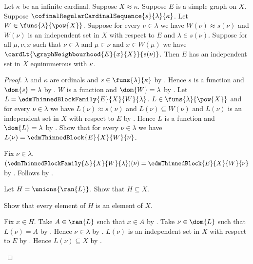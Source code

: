 \begin{theorem}\label{singular_selected_blocks_assemble}
    Let $\kappa$ be an infinite cardinal.
    Suppose $X\approx\kappa$.
    Suppose $E$ is a simple graph on $X$.
    Suppose $\cofinalRegularCardinalSequence{s}{\lambda}{\kappa}$.
    Let $W\in\funs{\lambda}{\pow{X}}$.
    Suppose for every $\nu\in\lambda$ we have
        $W(\nu)\approx s(\nu)$ and
        $W(\nu)$ is an independent set in $X$ with respect to $E$ and
        $\lambda\in s(\nu)$.
    Suppose for all $\mu,\nu,x$ such that $\nu\in\lambda$ and
        $\mu\in\nu$ and $x\in W(\mu)$ we have
        $\cardLt{\graphNeighbourhood{E}{x}{X}}{s(\nu)}$.
    Then $E$ has an independent set in $X$ equinumerous with $\kappa$.
\end{theorem}
\begin{proof}
    $\lambda$ and $\kappa$ are ordinals and
        $s\in\funs{\lambda}{\kappa}$ by
        .
    Hence $s$ is a function and $\dom{s}=\lambda$ by
        .
    $W$ is a function and $\dom{W}=\lambda$ by
        .
    Let $L=\edmThinnedBlockFamily{E}{X}{W}{\lambda}$.
    $L\in\funs{\lambda}{\pow{X}}$ and
        for every $\nu\in\lambda$ we have
            $L(\nu)\approx s(\nu)$ and $L(\nu)\subseteq W(\nu)$ and
            $L(\nu)$ is an independent set in $X$ with respect to $E$ by
        .
    Hence $L$ is a function and $\dom{L}=\lambda$ by
        .
    Show that for every $\nu\in\lambda$ we have
        $L(\nu)=\edmThinnedBlock{E}{X}{W}{\nu}$.
    \begin{subproof}
        Fix $\nu\in\lambda$.
        $(\edmThinnedBlockFamily{E}{X}{W}{\lambda})(\nu)
            =\edmThinnedBlock{E}{X}{W}{\nu}$ by
            .
        Follows by \auto.
    \end{subproof}
    Let $H=\unions{\ran{L}}$.
    Show that $H\subseteq X$.
    \begin{subproof}
        Show that every element of $H$ is an element of $X$.
        \begin{subproof}
            Fix $x\in H$.
            Take $A\in\ran{L}$ such that $x\in A$ by
                .
            Take $\nu\in\dom{L}$ such that $L(\nu)=A$ by
                .
            Hence $\nu\in\lambda$ by \auto.
            $L(\nu)$ is an independent set in $X$ with respect to $E$ by
                \auto.
            Hence $L(\nu)\subseteq X$ by .

\end{subproof}
\end{subproof}
\end{proof}
